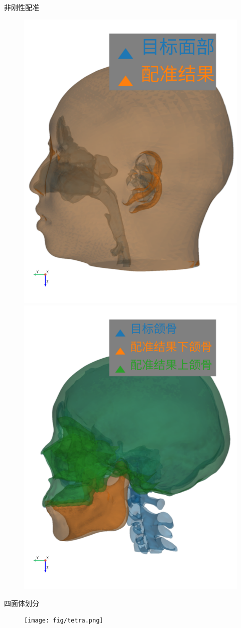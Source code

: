 \documentclass{beamer}
\begin{document}
\begin{frame}{非刚性配准}
  \begin{figure}
    \centering
    \includegraphics[height = 0.6 \linewidth]{fig/register/register-face.pdf}
    \includegraphics[height = 0.6 \linewidth]{fig/register/register-skull.pdf}
  \end{figure}
\end{frame}

\begin{frame}{四面体划分}
  \begin{figure}
    \centering
    \texttt{[image: fig/tetra.png]}
  \end{figure}
\end{frame}
\end{document}
